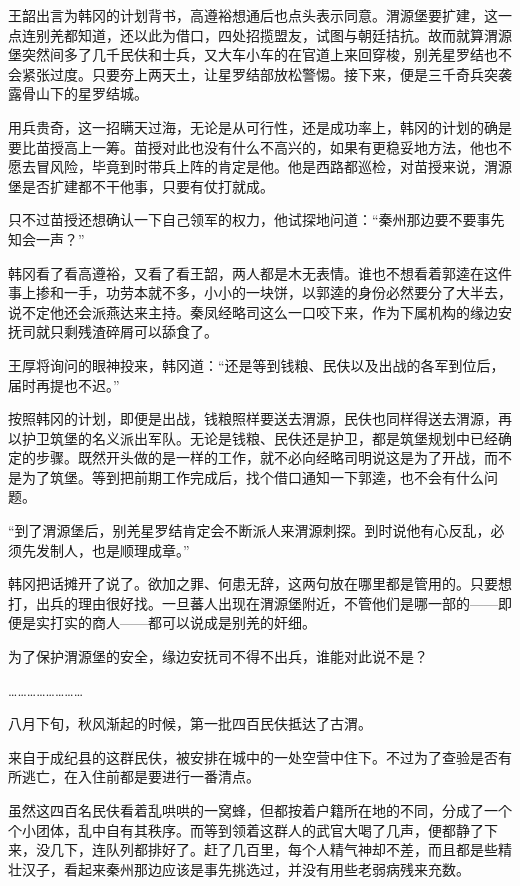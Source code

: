 王韶出言为韩冈的计划背书，高遵裕想通后也点头表示同意。渭源堡要扩建，这一点连别羌都知道，还以此为借口，四处招揽盟友，试图与朝廷拮抗。故而就算渭源堡突然间多了几千民伕和士兵，又大车小车的在官道上来回穿梭，别羌星罗结也不会紧张过度。只要夯上两天土，让星罗结部放松警惕。接下来，便是三千奇兵突袭露骨山下的星罗结城。

用兵贵奇，这一招瞒天过海，无论是从可行性，还是成功率上，韩冈的计划的确是要比苗授高上一筹。苗授对此也没有什么不高兴的，如果有更稳妥地方法，他也不愿去冒风险，毕竟到时带兵上阵的肯定是他。他是西路都巡检，对苗授来说，渭源堡是否扩建都不干他事，只要有仗打就成。

只不过苗授还想确认一下自己领军的权力，他试探地问道：“秦州那边要不要事先知会一声？”

韩冈看了看高遵裕，又看了看王韶，两人都是木无表情。谁也不想看着郭逵在这件事上掺和一手，功劳本就不多，小小的一块饼，以郭逵的身份必然要分了大半去，说不定他还会派燕达来主持。秦凤经略司这么一口咬下来，作为下属机构的缘边安抚司就只剩残渣碎屑可以舔食了。

王厚将询问的眼神投来，韩冈道：“还是等到钱粮、民伕以及出战的各军到位后，届时再提也不迟。”

按照韩冈的计划，即便是出战，钱粮照样要送去渭源，民伕也同样得送去渭源，再以护卫筑堡的名义派出军队。无论是钱粮、民伕还是护卫，都是筑堡规划中已经确定的步骤。既然开头做的是一样的工作，就不必向经略司明说这是为了开战，而不是为了筑堡。等到把前期工作完成后，找个借口通知一下郭逵，也不会有什么问题。

“到了渭源堡后，别羌星罗结肯定会不断派人来渭源刺探。到时说他有心反乱，必须先发制人，也是顺理成章。”

韩冈把话摊开了说了。欲加之罪、何患无辞，这两句放在哪里都是管用的。只要想打，出兵的理由很好找。一旦蕃人出现在渭源堡附近，不管他们是哪一部的——即便是实打实的商人——都可以说成是别羌的奸细。

为了保护渭源堡的安全，缘边安抚司不得不出兵，谁能对此说不是？

……………………

八月下旬，秋风渐起的时候，第一批四百民伕抵达了古渭。

来自于成纪县的这群民伕，被安排在城中的一处空营中住下。不过为了查验是否有所逃亡，在入住前都是要进行一番清点。

虽然这四百名民伕看着乱哄哄的一窝蜂，但都按着户籍所在地的不同，分成了一个个小团体，乱中自有其秩序。而等到领着这群人的武官大喝了几声，便都静了下来，没几下，连队列都排好了。赶了几百里，每个人精气神却不差，而且都是些精壮汉子，看起来秦州那边应该是事先挑选过，并没有用些老弱病残来充数。


